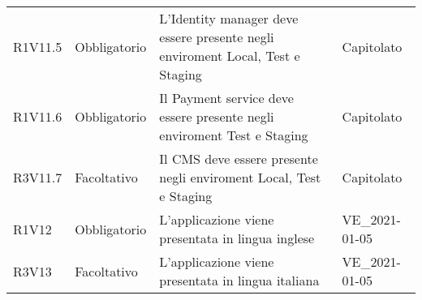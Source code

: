 {\begin{longtable}{C{2.5cm} C{2.8cm} C{6.7cm} C{2.5cm}}
R1V11.5 & Obbligatorio & L'Identity manager deve essere presente negli enviroment Local, Test e Staging & Capitolato \\
R1V11.6 & Obbligatorio & Il Payment service deve essere presente negli enviroment Test e Staging & Capitolato \\
R3V11.7 & Facoltativo & Il CMS deve essere presente negli enviroment Local, Test e Staging & Capitolato \\

R1V12 & Obbligatorio & L'applicazione viene presentata in lingua inglese & VE\_2021-01-05 \\
R3V13 & Facoltativo & L'applicazione viene presentata in lingua italiana & VE\_2021-01-05 \\

\end{longtable}

}